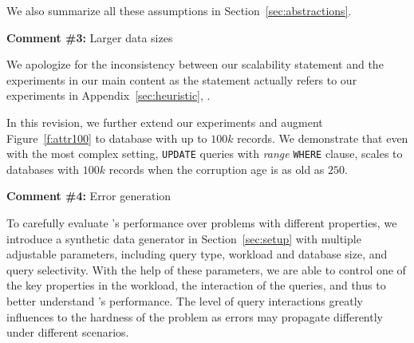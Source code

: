 We also summarize all these assumptions in Section~\ref{sec:abstractions}.


\comskip

\noindent
\textbf{Comment \#3:} Larger data sizes
\begin{quote}
\end{quote}

We apologize for the inconsistency between our scalability statement and the experiments 
in our main content as the statement actually refers to our experiments in Appendix~\ref{sec:heuristic}, . 

In this revision, we further extend our experiments and augment
Figure~\ref{f:attr100} to database with up to $100k$ records. 
We demonstrate that even with the most complex
setting, \texttt{UPDATE} queries with \textit{range} \texttt{WHERE} clause,
\sys scales to databases with $100k$ records when the corruption age is as old
as $250$.



\comskip

\noindent
\textbf{Comment \#4:} Error generation
\begin{quote}
\end{quote}


To carefully evaluate \sys's performance over problems with different
properties, we introduce a synthetic data generator in Section~\ref{sec:setup}
with multiple adjustable parameters, including query type, workload and
database size, and query selectivity. With the help of these parameters, we
are able to control one of the key properties in the workload, the interaction
of the queries, and thus to better understand \sys's performance. The level of
query interactions greatly influences to the hardness of the problem as errors
may propagate differently under different scenarios.

